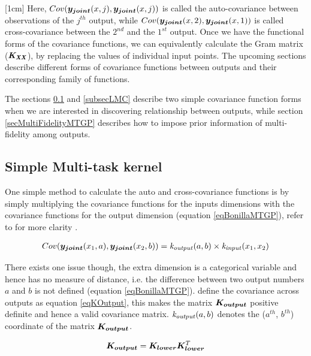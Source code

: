 [1cm]
Here, $Cov(\boldsymbol{y_{joint}}(x, j), \boldsymbol{y_{joint}}(x, j))$ is called the  auto-covariance between observations of the $j^{th}$ output, while $Cov(\boldsymbol{y_{joint}}(x, 2), \boldsymbol{y_{joint}}(x, 1))$ is called cross-covariance between the $2^{nd}$ and the $1^{st}$ output. Once we have the functional forms of the covariance functions, we can equivalently calculate the Gram matrix ($\bm{\mathit{K_{XX}}}$), by replacing the values of individual input points. The upcoming sections describe different forms of covariance functions between outputs and their corresponding family of functions.

The sections \ref{simpleMultiTask} and \ref{subsecLMC} describe two simple covariance function forms when we are interested in discovering relationship between outputs, while section \ref{secMultiFidelityMTGP} describes how to impose prior information of multi-fidelity among outputs. 

\subsection{Simple Multi-task kernel}\label{simpleMultiTask}

One simple method to calculate the auto and cross-covariance functions is by simply multiplying the covariance functions for the inputs dimensions with the covariance functions for the output dimension (equation \ref{eqBonillaMTGP}), refer to \cite{bonilla2007multi} for more clarity .   

\begin{align}\label{eqBonillaMTGP}
    Cov(\boldsymbol{y_{joint}}(x_{1}, a), \boldsymbol{y_{joint}}(x_{2}, b)) = \mathit{k_{output}}(a, b) \times \mathit{k_{input}}(x_{1}, x_{2})
\end{align}

There exists one issue though, the extra dimension is a categorical variable and hence has no measure of distance, i.e. the difference between two output numbers $a$ and $b$ is not defined (equation \ref{eqBonillaMTGP}). \cite{bonilla2007multi} define the covariance across outputs as equation \ref{eqKOutput}, this makes the matrix $\boldsymbol{K_{output}}$ positive definite and hence a valid covariance matrix. $\mathit{k_{output}}(a, b)$ denotes the ($a^{th}$, $b^{th}$) coordinate of the matrix $\boldsymbol{K_{output}}$.

\begin{equation}\label{eqKOutput}
\boldsymbol{K_{output}} = \boldsymbol{K_{lower}}\boldsymbol{K_{lower}}^T
\end{equation}

